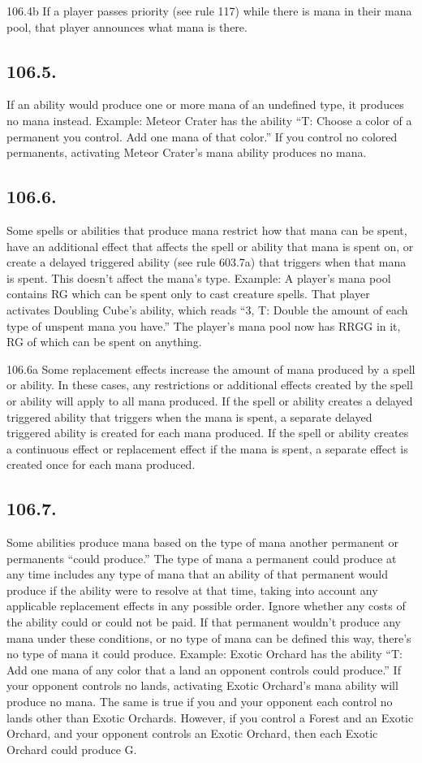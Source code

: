 106.4b If a player passes priority (see rule 117) while there is mana in their mana pool, that player announces what mana is there.

\subsection*{106.5.}
If an ability would produce one or more mana of an undefined type, it produces no mana instead.
Example: Meteor Crater has the ability “{T}: Choose a color of a permanent you control. Add one mana of that color.” If you control no colored permanents, activating Meteor Crater’s mana ability produces no mana.

\subsection*{106.6.}
Some spells or abilities that produce mana restrict how that mana can be spent, have an additional effect that affects the spell or ability that mana is spent on, or create a delayed triggered ability (see rule 603.7a) that triggers when that mana is spent. This doesn’t affect the mana’s type.
Example: A player’s mana pool contains {R}{G} which can be spent only to cast creature spells. That player activates Doubling Cube’s ability, which reads “{3}, {T}: Double the amount of each type of unspent mana you have.” The player’s mana pool now has {R}{R}{G}{G} in it, {R}{G} of which can be spent on anything.

106.6a Some replacement effects increase the amount of mana produced by a spell or ability. In these cases, any restrictions or additional effects created by the spell or ability will apply to all mana produced. If the spell or ability creates a delayed triggered ability that triggers when the mana is spent, a separate delayed triggered ability is created for each mana produced. If the spell or ability creates a continuous effect or replacement effect if the mana is spent, a separate effect is created once for each mana produced.

\subsection*{106.7.}
Some abilities produce mana based on the type of mana another permanent or permanents “could produce.” The type of mana a permanent could produce at any time includes any type of mana that an ability of that permanent would produce if the ability were to resolve at that time, taking into account any applicable replacement effects in any possible order. Ignore whether any costs of the ability could or could not be paid. If that permanent wouldn’t produce any mana under these conditions, or no type of mana can be defined this way, there’s no type of mana it could produce.
Example: Exotic Orchard has the ability “{T}: Add one mana of any color that a land an opponent controls could produce.” If your opponent controls no lands, activating Exotic Orchard’s mana ability will produce no mana. The same is true if you and your opponent each control no lands other than Exotic Orchards. However, if you control a Forest and an Exotic Orchard, and your opponent controls an Exotic Orchard, then each Exotic Orchard could produce {G}.

